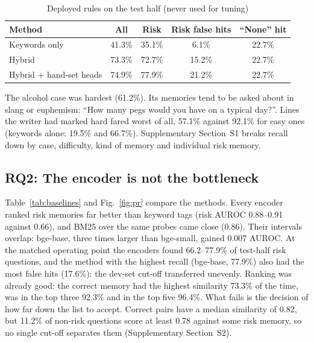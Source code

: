\documentclass[sn-mathphys-num]{sn-jnl}
\begin{document}
\begin{table}[t]
\caption{Deployed rules on the test half (never used for tuning)}
\label{tab:test}
\footnotesize
\begin{tabular*}{\linewidth}{@{\extracolsep{\fill}}lcccc@{}}
\toprule
Method & All & Risk & Risk false hits & ``None'' hit\\
\midrule
Keywords only & 41.3\% & 35.1\% & 6.1\% & 22.7\%\\
Hybrid & 73.3\% & 72.7\% & 15.2\% & 22.7\%\\
Hybrid + hand-set heads & 74.9\% & 77.9\% & 21.2\% & 22.7\%\\
\bottomrule
\end{tabular*}
\end{table}

The alcohol case was hardest (61.2\%). Its memories tend to be asked about in slang or euphemism: ``How many pegs would you have on a
typical day?''. Lines the writer had marked hard fared worst of all, 57.1\% against 92.1\% for easy ones (keywords alone: 19.5\% and 66.7\%).
Supplementary Section~S1 breaks recall down by case, difficulty, kind of memory and individual risk memory.

\subsection{RQ2: The encoder is not the bottleneck}
Table~\ref{tab:baselines} and Fig.~\ref{fig:pr} compare the methods. Every encoder ranked risk memories far better than keyword tags (risk AUROC
0.88--0.91 against 0.66), and BM25 over the same probes came close (0.86). Their intervals overlap: bge-base, three times larger than bge-small,
gained 0.007 AUROC. At the matched operating point the encoders found 66.2--77.9\% of test-half risk questions, and the method with the highest
recall (bge-base, 77.9\%) also had the most false hits (17.6\%): the dev-set cut-off transferred unevenly. Ranking was already good: the correct
memory had the highest similarity 73.3\% of the time, was in the top three 92.3\% and in the top five 96.4\%. What fails is the decision of how
far down the list to accept. Correct pairs have a median similarity of 0.82, but 11.2\% of non-risk questions score at least 0.78 against some risk
memory, so no single cut-off separates them (Supplementary Section~S2).
\end{document}
